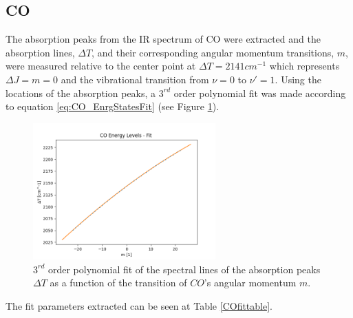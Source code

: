 \documentclass[reprint,amsmath,amssymb,aps, prl]{revtex4-2}
\begin{document}
\subsection{CO}
The absorption peaks from the IR spectrum of CO were extracted and the absorption lines,
$\Delta T$, 
and their corresponding angular momentum transitions,
$m$,
were measured relative to the center point at $\Delta T=2141 cm^{-1}$ which represents $\Delta J = m = 0 $ and the vibrational transition from $\nu =0$ to $\nu' =1$. Using the locations of the absorption peaks,
a $3^{rd}$ order polynomial fit was made according to equation \ref{eq:CO_EnrgStatesFit} (see Figure \ref{fig:COPolynomialfit}).
\begin{figure}[h!]
    \includegraphics[width=7cm]{Images/polynomial_3_fitting.png}
    \caption{$3^{rd}$ order polynomial fit of the spectral lines of the absorption peaks $\Delta T$ as a function of the transition of $CO$'s
    angular momentum $m$. }
    \label{fig:COPolynomialfit}
    \centering
\end{figure}
The fit parameters extracted can be seen at Table \ref{COfittable}. 
\begin{table}[h]
    \caption{Fit parameters of the $3^{rd}$ order polynomial fit}
    \label{COfittable}
    \end{table}
\end{document}
